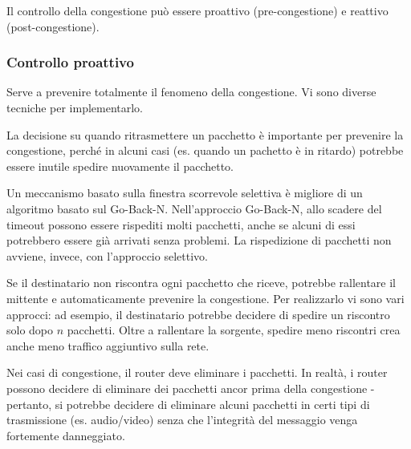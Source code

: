         Il controllo della congestione può essere proattivo (pre-congestione) e reattivo (post-congestione).
        
        \subsubsection{Controllo proattivo}
        
            Serve a prevenire totalmente il fenomeno della congestione. Vi sono diverse tecniche per implementarlo.
        
            
                La decisione su quando ritrasmettere un pacchetto è importante per prevenire la congestione, perché in alcuni casi (es. quando un pachetto è in ritardo) potrebbe essere inutile spedire nuovamente il pacchetto.
                
                
                Un meccanismo basato sulla finestra scorrevole selettiva è migliore di un algoritmo basato sul Go-Back-N. Nell'approccio Go-Back-N, allo scadere del timeout possono essere rispediti molti pacchetti, anche se alcuni di essi potrebbero essere già arrivati senza problemi. La rispedizione di pacchetti non avviene, invece, con l'approccio selettivo.
                
            
                Se il destinatario non riscontra ogni pacchetto che riceve, potrebbe rallentare il mittente e automaticamente prevenire la congestione. Per realizzarlo vi sono vari approcci: ad esempio, il destinatario potrebbe decidere di spedire un riscontro solo dopo $n$ pacchetti. Oltre a rallentare la sorgente, spedire meno riscontri crea anche meno traffico aggiuntivo sulla rete.
                
            
                Nei casi di congestione, il router deve eliminare i pacchetti. In realtà, i router possono decidere di eliminare dei pacchetti ancor prima della congestione - pertanto, si potrebbe decidere di eliminare alcuni pacchetti in certi tipi di trasmissione (es. audio/video) senza che l'integrità del messaggio venga fortemente danneggiato.
                
            
